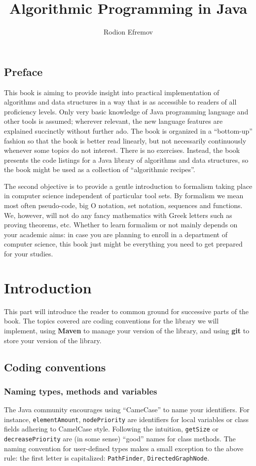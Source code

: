 \documentclass[oneside]{book}
\title{Algorithmic Programming in Java}
\author{Rodion Efremov}
\date{}
\begin{document}
\maketitle

\chapter*{Preface}
This book is aiming to provide insight into practical implementation of algorithms and data structures in a way that is as accessible to readers of all proficiency levels. Only very basic knowledge of Java programming language and other tools is assumed; wherever relevant, the new language features are explained succinctly without further ado. The book is organized in a ``bottom-up'' fashion so that the book is better read linearly, but not necessarily continuously whenever some topics do not interest. There is no exercises. Instead, the book presents the code listings for a Java library of algorithms and data structures, so the book might be used as a collection of ``algorithmic recipes''. 

The second objective is to provide a gentle introduction to formalism taking place in computer science independent of particular tool sets. By formalism we mean most often pseudo-code, big O notation, set notation, sequences and functions. We, however, will not do any fancy mathematics with Greek letters such as proving theorems, etc. Whether to learn formalism or not mainly depends on your academic aims: in case you are planning to enroll in a department of computer science, this book just might be everything you need to get prepared for your studies.

\makeatletter\@openrightfalse
\part{Introduction}
This part will introduce the reader to common ground for successive parts of the book. The topics covered are coding conventions for the library we will implement, using \textbf{Maven} to manage your version of the library, and using \textbf{git} to store your version of the library.

\chapter{Coding conventions}
\@openrighttrue\makeatother
\section{Naming types, methods and variables}
The Java community encourages using ``CameCase'' to name your identifiers. For instance, \texttt{elementAmount}, \texttt{nodePriority} are identifiers for local variables or class fields adhering to CamelCase style. Following the intuition, \texttt{getSize} or \texttt{decreasePriority} are (in some sense) ``good'' names for class methods. The naming convention for user-defined types makes a small exception to the above rule: the first letter is capitalized: \texttt{PathFinder}, \texttt{DirectedGraphNode}.
\end{document}
